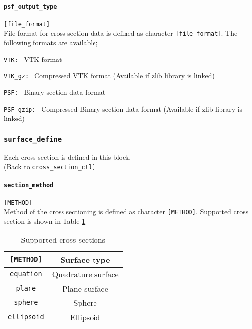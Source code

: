 \paragraph{\tt psf\_output\_type}
\label{href_t:psf_output_type}
\verb|[file_format]| \\
File format for cross section data is defined as character \verb|[file_format]|. The following formats are available;
\begin{description}
\item{\tt VTK: }               VTK format
\item{\tt VTK\_gz: }           Compressed VTK format (Available if zlib library is linked)
\item{\tt PSF: }               Binary section data format
\item{\tt PSF\_gzip: }         Compressed Binary section data format (Available if zlib library is linked)
\end{description}

\subsubsection{\tt surface\_define}
\label{href_t:surface_define}
Each cross section is defined in this block. \\
\hyperref[href_i:cross_section_ctl]{(Back to {\tt cross\_section\_ctl)}} \\

\paragraph{\tt section\_method}
\label{href_t:section_method}
\verb|[METHOD]| \\
Method of the cross sectioning is defined as character \verb|[METHOD]|. Supported cross section is shown in Table \ref{table:surface_list}
%
\begin{table}[htp]
\caption{Supported cross sections}
\begin{center}
\begin{tabular}{|c|c|}
\hline
\verb|[METHOD]| & Surface type \\ \hline
\verb|equation| & Quadrature surface \\
\verb|plane| & Plane surface \\
\verb|sphere| & Sphere \\
\verb|ellipsoid| & Ellipsoid  \\
\hline
\end{tabular}
\end{center}
\label{table:surface_list}
\end{table}
%

